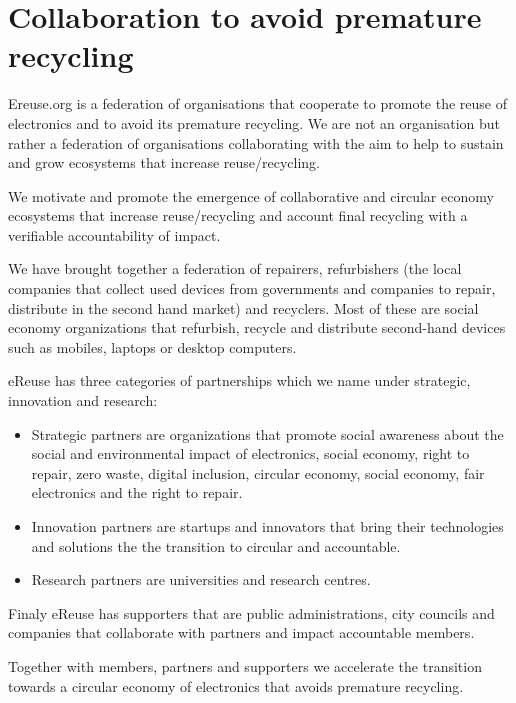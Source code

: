 \documentclass[
]{book}
\begin{document}
\hypertarget{collaboration-to-avoid-premature-recycling}{%
\section{Collaboration to avoid premature recycling}\label{collaboration-to-avoid-premature-recycling}}

Ereuse.org is a federation of organisations that cooperate to promote the reuse of electronics and to avoid its premature recycling. We are not an organisation but rather a federation of organisations collaborating with the aim to help to sustain and grow ecosystems that increase reuse/recycling.

We motivate and promote the emergence of collaborative and circular economy ecosystems that increase reuse/recycling and account final recycling with a verifiable accountability of impact.

We have brought together a federation of repairers, refurbishers (the local companies that collect used devices from governments and companies to repair, distribute in the second hand market) and recyclers. Most of these are social economy organizations that refurbish, recycle and distribute second-hand devices such as mobiles, laptops or desktop computers.

eReuse has three categories of partnerships which we name under strategic, innovation and research:

\begin{itemize}
\item
  Strategic partners are organizations that promote social awareness about the social and environmental impact of electronics, social economy, right to repair, zero waste, digital inclusion, circular economy, social economy, fair electronics and the right to repair.
\item
  Innovation partners are startups and innovators that bring their technologies and solutions the the transition to circular and accountable.
\item
  Research partners are universities and research centres.
\end{itemize}

Finaly eReuse has supporters that are public administrations, city councils and companies that collaborate with partners and impact accountable members.

Together with members, partners and supporters we accelerate the transition towards a circular economy of electronics that avoids premature recycling.
\end{document}
